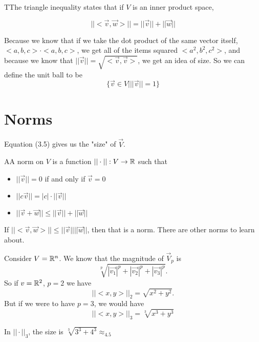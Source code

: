 	\begin{theorem}
		TThe triangle inequality states that if $V$ is an inner product space,

		\begin{equation}
			| | <\vec{v},\vec{w}> | | = | | \vec{v} | | + | | \vec{w} | |
		\end{equation}
	\end{theorem}

	Because we know that if we take the dot product of the same vector itself, $<a,b,c>\cdot<a,b,c>$, we get all of the items squared $<a^2,b^2,c^2>$, and because we know that $| | \vec{v} | | = \sqrt{<\vec{v},\vec{v}>}$, we get an idea of size. So we can define the unit ball to be 
	\begin{equation}
		\{\vec{v}\in V\Big| | | \vec{v} | | = 1\}		
	\end{equation}

\section{Norms}

	Equation (3.5) gives us the "size" of $\vec{V}$.

	\begin{definition}
		AA norm on $V$ is a function $ | | \cdot | |:V\to\mathbb{R}$ such that 
		\begin{itemize}
			\item $| | \vec{v} | | = 0$ if and only if $\vec{v}=0$
			\item $| | c\vec{v} | | = |c|\cdot| | \vec{v} | |$
			\item $| | \vec{v}+\vec{w} | | \le | | \vec{v} | | + | | \vec{w} | |$
		\end{itemize}

		If $||<\vec{v},\vec{w}>||\le | | \vec{v}  | | | | \vec{w} | |$, then that is a norm. There are other norms to learn about. 
			
	\end{definition}

	\begin{problem}
		Consider $V=\mathbb{R}^n$. We know that the magnitude of $\vec{V}_p$ is 
		\begin{equation}
			\sqrt[p]{|\vec{v_1}|^p+|\vec{v_2}|^p+|\vec{v_3}|^p}.
		\end{equation}
		So if $v=\mathbb{R}^2$, $p=2$ we have 
		\begin{equation}
			| |<x,y>| | _2=\sqrt{x^2+y^2}. 
		\end{equation}
		But if we were to have $p=3$, we would have 
		\begin{equation}
			| | <x,y> | |_3=\sqrt[3]{x^3+y^3}
		\end{equation}
		
		In $| | \cdot | |_3$, the size is $\sqrt[3]{3^3+4^3} \approx_4.5$
	\end{problem}

